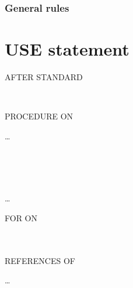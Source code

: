 \subsubsection{General rules}

\section{USE statement}

\begin{syntax}
  \begin{0-1}
  \end{0-1}
  AFTER STANDARD
  \begin{1=}
     \\
  \end{1=}
  PROCEDURE ON

  \begin{1=}
    \begin{1=}
      \filename
    \end{1=} \ldots
    \begin{0+}
       \\
       \\
       \\
    \end{0+} \ldots
  \end{1=}
\end{syntax}

\begin{syntax}[\deletedcolour]
   FOR  ON
  \begin{1=}
    \procedurename \\
      \\
     REFERENCES OF \identifier
  \end{1=} \ldots
\end{syntax}

\begin{syntax}[\miscextcolour]
\end{syntax}

\begin{syntax}
  \begin{0-1}
  \end{0-1}
    \identifier
\end{syntax}

